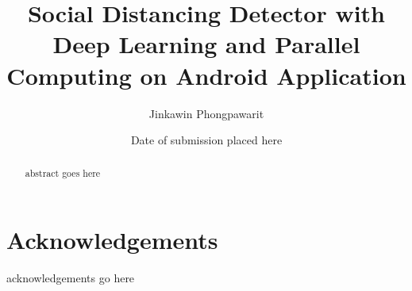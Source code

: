 \documentclass{mproj}
\begin{document}
\title{Social Distancing Detector with Deep Learning and Parallel Computing on Android Application}
\author{Jinkawin Phongpawarit}
\date{Date of submission placed here}
\maketitle

\begin{abstract}
abstract goes here
\end{abstract}

\educationalconsent


\newpage
\section*{Acknowledgements}

acknowledgements go here

\tableofcontents












\appendix %






\end{document}
